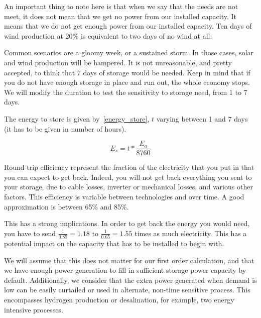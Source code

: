 An important thing to note here is that when we say that the needs are not meet, it does not mean that we get no power from our installed capacity. It means that we do not get enough power from our installed capacity. Ten days of wind production at 20\% is equivalent to two days of no wind at all.

Common scenarios are a gloomy week, or a sustained storm. In those cases, solar and wind production will be hampered. It is not unreasonable, and pretty accepted, to think that 7 days of storage would be needed. Keep in mind that if you do not have enough storage in place and run out, the whole economy stops. We will modify the duration to test the sensitivity to storage need, from 1 to 7 days.


\begin{remark}
The energy to store is given by~\ref{energy_store}, $t$ varying between 1 and 7 days (it has to be given in number of hours).

\begin{equation}\label{energy_store}
E_s = t * \frac{E_a}{8760}
\end{equation}

\end{remark}

Round-trip efficiency represent the fraction of the electricity that you put in that you can expect to get back. Indeed, you will not get back everything you sent to your storage, due to cable losses, inverter or mechanical losses, and various other factors. This efficiency is variable between technologies and over time. A good approximation is between 65\% and 85\%. 

This has a strong implications. In order to get back the energy you would need, you have to send $\frac{1}{0.85} = 1.18$ to $\frac{1}{0.65} = 1.55$ times as much electricity. This has a potential impact on the capacity that has to be installed to begin with.

We will assume that this does not matter for our first order calculation, and that we have enough power generation to fill in sufficient storage power capacity by default. Additionally, we consider that the extra power generated when demand is low can be easily curtailed or used in alternate, non-time sensitive process. This encompasses hydrogen production or desalination, for example, two energy intensive processes.


